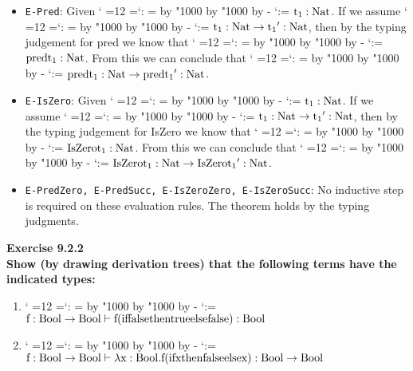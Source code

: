 \documentclass[12pt,letterpaper]{article}
\makeatletter
\newcommand{\hwSect}[1] {\noindent\large\bf#1\rm\normalsize}
\newenvironment{lambdac}
  {\catcode` =12 \setupspace
   \makeordinary{:}%
   $\mathgroup0 }
  {$}
{\catcode` =\active\gdef\setupspace{\def {\;}}}
\newcommand{\makeordinary}[1]{\@tempcnta=\mathcode`#1
  \@tempcntb=\@tempcnta
  \divide\@tempcntb by "1000
  \multiply\@tempcntb by "1000
  \advance\@tempcnta by -\@tempcntb
  \mathcode`#1=\@tempcnta}
\makeatother
\begin{document}
\begin{itemize}
\item {\tt E-Pred}:  Given \begin{lambdac}t_1 : Nat\end{lambdac}.  If we assume \begin{lambdac}t_1 : Nat \rightarrow {t_1}' : Nat\end{lambdac}, then by the typing judgement for pred we know that \begin{lambdac}pred t_1 : Nat\end{lambdac}.  From this we can conclude that \begin{lambdac}pred t_1 : Nat \rightarrow pred {t_1}' : Nat\end{lambdac}.

\item {\tt E-IsZero}:  Given \begin{lambdac}t_1 : Nat\end{lambdac}.  If we assume \begin{lambdac}t_1 : Nat \rightarrow {t_1}' : Nat\end{lambdac}, then by the typing judgement for IsZero we know that \begin{lambdac}IsZero t_1 : Nat\end{lambdac}.  From this we can conclude that \begin{lambdac}IsZero t_1 : Nat \rightarrow IsZero {t_1}' : Nat\end{lambdac}.

\item {\tt E-PredZero, E-PredSucc, E-IsZeroZero, E-IsZeroSucc}: No inductive step is required on these evaluation rules.  The theorem holds by the typing judgments.

\end{itemize}
\hwSect{Exercise 9.2.2}\\
Show (by drawing derivation trees) that the following terms have the indicated types:

\begin{enumerate}
\item \begin{lambdac}f: Bool\rightarrow{Bool} \vdash f (if false then true else false) : Bool \end{lambdac}
\item \begin{lambdac}f: Bool\rightarrow{Bool} \vdash \lambda{x}:Bool. f (if x then false else x) : Bool\rightarrow{Bool}\end{lambdac}\\
\end{enumerate}
\end{document}
